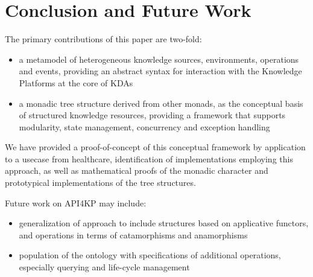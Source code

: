 \documentclass[runningheads]{llncs}
\begin{document}
\section{Conclusion and Future Work}
\label{sec:conc}
The primary contributions of this paper are two-fold:
\begin{itemize}
\item a metamodel of heterogeneous knowledge sources, environments, operations and events, providing an abstract syntax for interaction with the Knowledge Platforms at the core of KDAs
\item a monadic tree structure derived from other monads, as the conceptual basis of structured knowledge resources, providing a framework that supports modularity, state management, concurrency and exception handling
\end{itemize}
We have provided a proof-of-concept of this conceptual framework by application to a usecase from healthcare, identification of implementations employing this approach, as well as mathematical proofs of the monadic character and prototypical implementations of the tree structures.

Future work on API4KP may include:
\begin{itemize}
\item generalization of approach to include structures based on applicative functors, and
operations in terms of catamorphisms and anamorphisms
\item population of the ontology with specifications of additional operations, especially querying and life-cycle management
\end{itemize}


%
%




\end{document}
